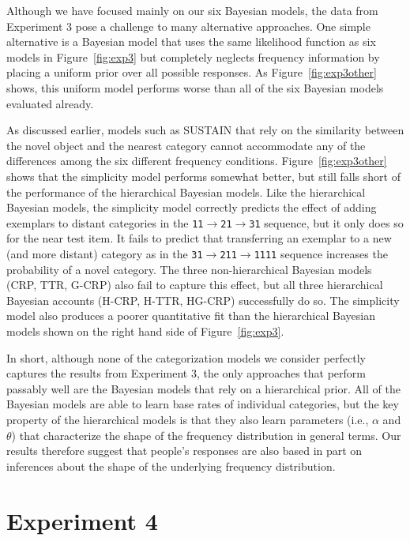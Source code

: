 \documentclass[doc]{apa6}
\newcommand{\dist}[1]{\texttt{#1}}
\newcommand{\goesto}{$\rightarrow$}
\begin{document}
Although we have focused mainly on our six Bayesian models, the data from Experiment 3 pose a challenge to many alternative approaches. One simple alternative is a Bayesian model that uses the same likelihood function as six models in Figure~\ref{fig:exp3} but completely neglects frequency information by placing a uniform prior over all possible responses. As Figure~\ref{fig:exp3other} shows, this uniform model performs worse than all of the six Bayesian models evaluated already.

As discussed earlier, models such as SUSTAIN that rely on the similarity between the novel object and the nearest category cannot accommodate any of the differences among the six different frequency conditions. Figure~\ref{fig:exp3other} shows that the simplicity model performs somewhat better, but still falls short of the performance of the hierarchical Bayesian models.  Like the hierarchical Bayesian models, the simplicity model correctly predicts the effect of adding exemplars to distant categories in the \dist{11}\goesto\dist{21}\goesto\dist{31} sequence, but it only does so for the near test item. It fails to predict that transferring an exemplar to a new (and more distant) category as in the \dist{31}\goesto\dist{211}\goesto\dist{1111} sequence increases the probability of a novel category. The three non-hierarchical Bayesian models (CRP, TTR, G-CRP) also fail to capture this effect, but all three hierarchical Bayesian accounts (H-CRP, H-TTR, HG-CRP) successfully do so. The simplicity model also produces a poorer quantitative fit than the hierarchical Bayesian models shown on the right hand side of Figure~\ref{fig:exp3}.

In short, although none of the categorization models we consider perfectly captures the results from Experiment 3, the only approaches that perform passably well are the Bayesian models that rely on a hierarchical prior. All of the Bayesian models are able to learn base rates of individual categories, but the key property of the hierarchical models is that they also learn parameters (i.e., $\alpha$ and $\theta$) that characterize the shape of the frequency distribution in general terms. Our results therefore suggest that people's responses are also based in part on inferences about the shape of the underlying frequency distribution.

\section{Experiment 4}
\end{document}
